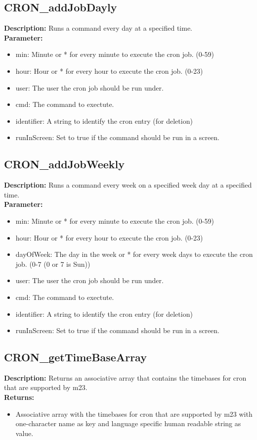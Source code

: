 \subsection{CRON\_addJobDayly}
\textbf{Description:} Runs a command every day at a specified time.\\
\textbf{Parameter:}
\begin{itemize}
\item min: Minute or * for every minute to execute the cron job. (0-59)
\item hour: Hour or * for every hour to execute the cron job. (0-23)
\item user: The user the cron job should be run under.
\item cmd: The command to exectute.
\item identifier: A string to identify the cron entry (for deletion)
\item runInScreen: Set to true if the command should be run in a screen.
\end{itemize}

\subsection{CRON\_addJobWeekly}
\textbf{Description:} Runs a command every week on a specified week day at a specified time.\\
\textbf{Parameter:}
\begin{itemize}
\item min: Minute or * for every minute to execute the cron job. (0-59)
\item hour: Hour or * for every hour to execute the cron job. (0-23)
\item dayOfWeek: The day in the week or * for every week days to execute the cron job. (0-7 (0 or 7 is Sun))
\item user: The user the cron job should be run under.
\item cmd: The command to exectute.
\item identifier: A string to identify the cron entry (for deletion)
\item runInScreen: Set to true if the command should be run in a screen.
\end{itemize}

\subsection{CRON\_getTimeBaseArray}
\textbf{Description:} Returns an associative array that contains the timebases for cron that are supported by m23.\\
\textbf{Returns:}
\begin{itemize}
\item Associative array with the timebases for cron that are supported by m23 with one-character name as key and language specific human readable string as value.
\end{itemize}

